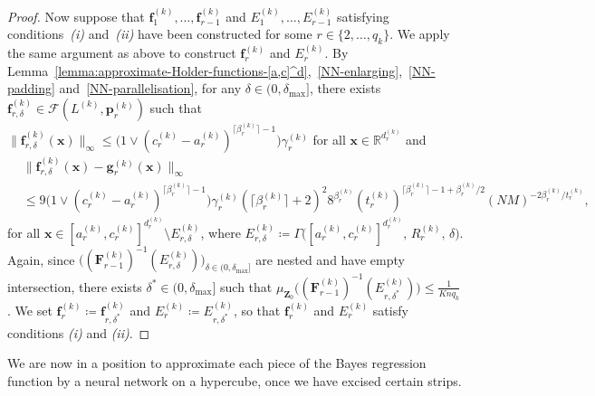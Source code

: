 \documentclass[12pt]{article}
\begin{document}
\begin{proof}
    Now suppose that $\bm f^{(k)}_1,\ldots,\bm f^{(k)}_{r-1}$ and $E^{(k)}_1,\ldots,E^{(k)}_{r-1}$ satisfying conditions~\emph{(i)} and~\emph{(ii)} have been constructed for some $r\in\{2,\ldots,q_k\}$. We apply the same argument as above to construct $\bm f^{(k)}_r$ and $E^{(k)}_r$. By Lemma~\ref{lemma:approximate-Holder-functions-[a,c]^d},~\ref{NN-enlarging},~\ref{NN-padding} and~\ref{NN-parallelisation}, for any $\delta\in(0,\delta_{\max}]$, there exists $\bm f^{(k)}_{r,\delta} \in \mathcal{F}(L^{(k)}, \bm p^{(k)}_r)$ such that $\|\bm f_{r,\delta}^{(k)}(\bm x)\|_{\infty} \leq \bigl( 1 \vee (c_r^{(k)} - a_r^{(k)})^{\lceil \beta_r^{(k)} \rceil - 1} \bigr) \gamma_r^{(k)}$ for all $\bm x \in \mathbb{R}^{d_r^{(k)}}$ and
    \begin{align*}
        &\bigl\|\bm f^{(k)}_{r,\delta}(\bm x) - \bm g^{(k)}_r(\bm x)\bigr\|_{\infty}\\
        & \leq 9 \bigl( 1 \vee (c_r^{(k)} - a_r^{(k)})^{\lceil \beta_r^{(k)} \rceil - 1} \bigr) \gamma^{(k)}_r (\lceil \beta^{(k)}_r \rceil +2)^2 8^{\beta_r^{(k)}} (t^{(k)}_r)^{\lceil \beta_r^{(k)} \rceil - 1 + \beta^{(k)}_r/2} (NM)^{-2\beta^{(k)}_r / t^{(k)}_r},
    \end{align*}
    for all $\bm x \in [a^{(k)}_r, c^{(k)}_r]^{d^{(k)}_r} \setminus E^{(k)}_{r,\delta}$, where $E^{(k)}_{r,\delta} \coloneqq \Gamma\bigl([a^{(k)}_r, c^{(k)}_r]^{d^{(k)}_r},\, R^{(k)}_r,\, \delta\bigr)$. Again, since $\bigl((\bm F_{r-1}^{(k)})^{-1}(E_{r,\delta}^{(k)})\bigr)_{\delta \in (0,\delta_{\max}]}$ are nested and have empty intersection, there exists $\delta^* \in (0,\delta_{\max}]$ such that $\mu_{\bm Z_0}\bigl((\bm F_{r-1}^{(k)})^{-1}(E^{(k)}_{r,\delta^*})\bigr) \leq \frac{1}{Kn q_k}$. We set $\bm f^{(k)}_r \coloneqq \bm f^{(k)}_{r,\delta^*}$ and $E^{(k)}_r \coloneqq E^{(k)}_{r,\delta^*}$, so that $\bm f^{(k)}_r$ and $E^{(k)}_r$ satisfy conditions \emph{(i)} and \emph{(ii)}.
\end{proof}
We are now in a position to approximate each piece of the Bayes regression function by a neural network on a hypercube, once we have excised certain strips.
\end{document}
